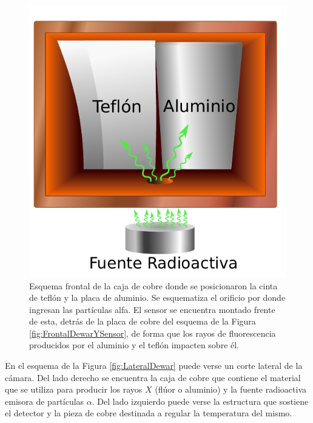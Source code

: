 \begin{figure}[h]
    \centering
    \includegraphics[scale=0.7]{Figs/CajaSensor.pdf}
    \caption{Esquema frontal de la caja de cobre donde se posicionaron la cinta de teflón y la placa de aluminio. Se esquematiza el orificio por donde ingresan las partículas alfa. El sensor se encuentra montado frente de esta, detrás de la placa de cobre del esquema de la Figura \ref{fig:FrontalDewarYSensor}, de forma que los rayos de fluorescencia producidos por el aluminio y el teflón impacten sobre él.}
    \label{fig:FrontalAlYF}
\end{figure}

En el esquema de la Figura \ref{fig:LateralDewar} puede verse un corte lateral de la cámara. Del lado derecho se encuentra la caja de cobre que contiene el material que se utiliza para producir los rayos $X$ (flúor o aluminio) y la fuente radioactiva emisora de partículas $\alpha$. 
Del lado izquierdo puede verse la estructura que sostiene el detector y la pieza de cobre destinada a regular la temperatura del mismo.

